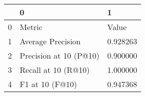 \begin{tabular}{lll}
\toprule
 & 0 & 1 \\
\midrule
0 & Metric & Value \\
1 & Average Precision & 0.928263 \\
2 & Precision at 10 (P@10) & 0.900000 \\
3 & Recall at 10 (R@10) & 1.000000 \\
4 & F1 at 10 (F@10) & 0.947368 \\
\bottomrule
\end{tabular}
